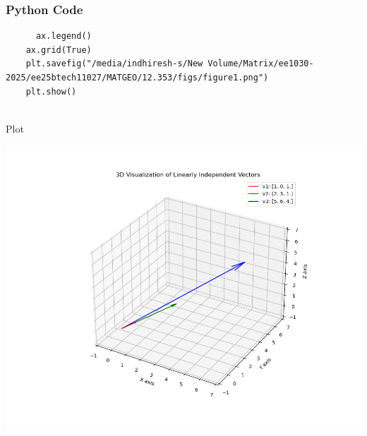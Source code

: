 \documentclass{beamer}
\begin{document}
    \begin{frame}[fragile]
        \frametitle{Python Code}
        \begin{lstlisting}
      ax.legend()
    ax.grid(True)
    plt.savefig("/media/indhiresh-s/New Volume/Matrix/ee1030-2025/ee25btech11027/MATGEO/12.353/figs/figure1.png")
    plt.show()
    
        \end{lstlisting}
    \end{frame}
    
    \begin{frame}{Plot}
        \begin{center}
            \includegraphics[width=\columnwidth, height=0.8\textheight, keepaspectratio]{figs/figure1.png}
        \end{center}
    \end{frame}
   
\end{document}
